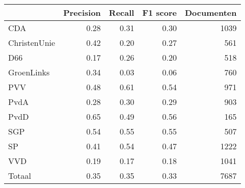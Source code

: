 \begin{tabular}{lrrrr}
\toprule
{} &  Precision &  Recall &  F1 score &  Documenten \\
\midrule
CDA          &       0.28 &    0.31 &      0.30 &        1039 \\
ChristenUnie &       0.42 &    0.20 &      0.27 &         561 \\
D66          &       0.17 &    0.26 &      0.20 &         518 \\
GroenLinks   &       0.34 &    0.03 &      0.06 &         760 \\
PVV          &       0.48 &    0.61 &      0.54 &         971 \\
PvdA         &       0.28 &    0.30 &      0.29 &         903 \\
PvdD         &       0.65 &    0.49 &      0.56 &         165 \\
SGP          &       0.54 &    0.55 &      0.55 &         507 \\
SP           &       0.41 &    0.54 &      0.47 &        1222 \\
VVD          &       0.19 &    0.17 &      0.18 &        1041 \\
Totaal       &       0.35 &    0.35 &      0.33 &        7687 \\
\bottomrule
\end{tabular}
